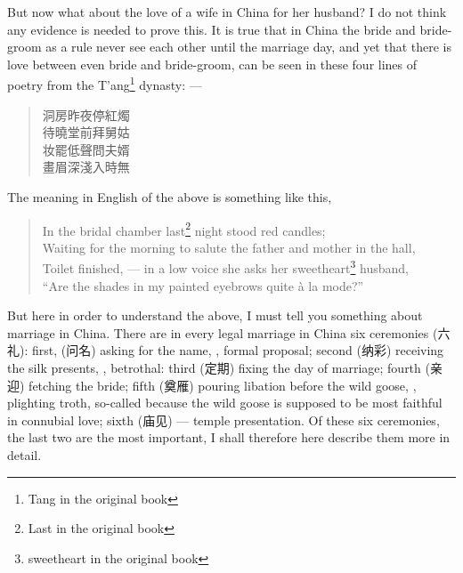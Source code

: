 But now what about the love of a wife in China for her husband?
I do not think any evidence is needed to prove this.
It is true that in China the bride and bride-groom as a rule never see each other until the marriage day, and yet that there is love between even bride and bride-groom, can be seen in these four lines of poetry from the T'ang\footnote{Tang in the original book} dynasty: --- 
\begin{quote}\footnotesize
      洞房昨夜停紅燭\\
      待曉堂前拜舅姑\\
      妆罷低聲問夫婿\\
      畫眉深淺入時無
\end{quote}
The meaning in English of the above is something like this,
\begin{quote}\footnotesize
    In the bridal chamber last\footnote{Last in the original book} night stood red candles;\\
    Waiting for the morning to salute the father and mother in the hall,\\
    Toilet finished, --- in a low voice she asks her sweetheart\footnote{sweetheart in the original book} husband,\\
    ``Are the shades in my painted eyebrows quite \`a la mode?'' 
\end{quote}

But here in order to understand the above, I must tell you something about marriage in China.
There are in every legal marriage in China six ceremonies (六礼): first, (问名) asking for the name, \ie, formal proposal; second (纳彩) receiving the silk presents, \ie, betrothal: third (定期) fixing the day of marriage; fourth (亲迎) fetching the bride; fifth (奠雁) pouring libation  before the wild  goose, \ie, plighting troth, so-called because the wild goose is supposed to be most faithful in connubial love; sixth (庙见) --- temple presentation.
Of these six ceremonies, the last two are the most important, I shall therefore here describe them more in detail.

